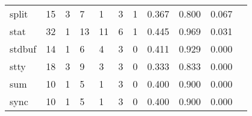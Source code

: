 \begin{longtable}{lp{1.2cm}p{1.2cm}p{1.2cm}p{1.2cm}p{1.2cm}p{1.2cm}p{1.2cm}p{1.2cm}p{1.2cm}p{1.2cm}}
split     &                                    15 &                                                  3 &                                                  7 &                                                  1 &                                                  3 &                                                  1 &                                              0.367 &                                              0.800 &                                              0.067 \\
stat      &                                    32 &                                                  1 &                                                 13 &                                                 11 &                                                  6 &                                                  1 &                                              0.445 &                                              0.969 &                                              0.031 \\
stdbuf    &                                    14 &                                                  1 &                                                  6 &                                                  4 &                                                  3 &                                                  0 &                                              0.411 &                                              0.929 &                                              0.000 \\
stty      &                                    18 &                                                  3 &                                                  9 &                                                  3 &                                                  3 &                                                  0 &                                              0.333 &                                              0.833 &                                              0.000 \\
sum       &                                    10 &                                                  1 &                                                  5 &                                                  1 &                                                  3 &                                                  0 &                                              0.400 &                                              0.900 &                                              0.000 \\
sync      &                                    10 &                                                  1 &                                                  5 &                                                  1 &                                                  3 &                                                  0 &                                              0.400 &                                              0.900 &                                              0.000 \\

\end{longtable}
